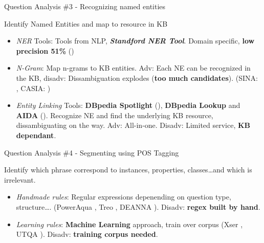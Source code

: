 \documentclass{beamer}
\begin{document}
\begin{frame}{Question Analysis \#3 - Recognizing named entities}
  \begin{card}
    Identify Named Entities and map to resource in KB
    \begin{itemize}
      \item \textit{NER} Tools: Tools from NLP, \textbf{\textit{Standford NER Tool}}. Domain specific, \textbf{low precision 51\%} (\cite{he2014a})
      \item \textit{N-Gram}: Map n-grams to KB entities. Adv: Each NE can be recognized in the KB, disadv: Dissambiguation explodes (\textbf{too much candidates}). (SINA: \cite{shekarpour2015a}, CASIA: \cite{he2014a})
      \item \textit{Entity Linking} Tools: \textbf{DBpedia Spotlight} (\cite{daiber2013a}), \textbf{DBpedia Lookup} and \textbf{AIDA} (\cite{yosef2011a}). Recognize NE and find the underlying KB resource, dissambiguating on the way. Adv: All-in-one. Disadv: Limited service, \textbf{KB dependant}.
    \end{itemize}
  \end{card}
\end{frame}


\begin{frame}{Question Analysis \#4 - Segmenting using POS Tagging}
  \begin{card}
    Identify which phrase correspond to instances, properties, classes\dots and which is irrelevant.
    \begin{itemize}
      \item \textit{Handmade rules}: Regular expressions depenending on question type, structure\dots. (PowerAqua \cite{lopez2012a}, Treo \cite{freitas2014a}, DEANNA \cite{yahya2013a}). Disadv: \textbf{regex built by hand}.
      \item \textit{Learning rules}: \textbf{Machine Learning} approach, train over corpus (Xser \cite{xu2014a}, UTQA \cite{pouran2016a}). Disadv: \textbf{training corpus needed}.
    \end{itemize}
  \end{card}
\end{frame}
\end{document}
